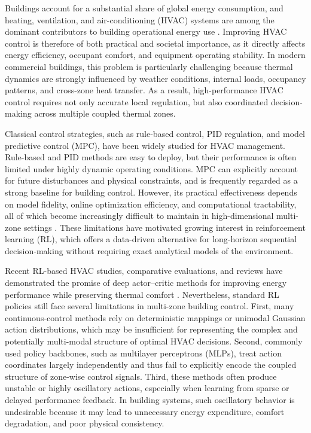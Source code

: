 \documentclass[lettersize,journal]{IEEEtran}
\theoremstyle{nonumberplain}     \theoremheaderfont{\bfseries\itshape}     \theorembodyfont{\normalfont}     \theoremseparator{:}     \theoremsymbol{\ensuremath{\blacksquare}}     \newtheorem{proof}{Proof}
\theoremstyle{plain}     \theoremheaderfont{\bfseries\itshape}     \theorembodyfont{\normalfont}     \theoremseparator{:}     \theoremsymbol{\ensuremath{\blacksquare}}     \newtheorem{remark}{Remark}
\begin{document}
Buildings account for a substantial share of global energy consumption, and heating, ventilation, and air-conditioning (HVAC) systems are among the dominant contributors to building operational energy use \cite{perez2008review,cao2016building,cuce2026role}. Improving HVAC control is therefore of both practical and societal importance, as it directly affects energy efficiency, occupant comfort, and equipment operating stability. In modern commercial buildings, this problem is particularly challenging because thermal dynamics are strongly influenced by weather conditions, internal loads, occupancy patterns, and cross-zone heat transfer. As a result, high-performance HVAC control requires not only accurate local regulation, but also coordinated decision-making across multiple coupled thermal zones.

Classical control strategies, such as rule-based control, PID regulation, and model predictive control (MPC), have been widely studied for HVAC management. Rule-based and PID methods are easy to deploy, but their performance is often limited under highly dynamic operating conditions. MPC can explicitly account for future disturbances and physical constraints, and is frequently regarded as a strong baseline for building control. However, its practical effectiveness depends on model fidelity, online optimization efficiency, and computational tractability, all of which become increasingly difficult to maintain in high-dimensional multi-zone settings \cite{drgovna2020all}. These limitations have motivated growing interest in reinforcement learning (RL), which offers a data-driven alternative for long-horizon sequential decision-making without requiring exact analytical models of the environment.

Recent RL-based HVAC studies, comparative evaluations, and reviews have demonstrated the promise of deep actor--critic methods for improving energy performance while preserving thermal comfort \cite{wei2017deep,biemann2021experimental,mason2019review,alsayed2024hvacreview}. Nevertheless, standard RL policies still face several limitations in multi-zone building control. First, many continuous-control methods rely on deterministic mappings or unimodal Gaussian action distributions, which may be insufficient for representing the complex and potentially multi-modal structure of optimal HVAC decisions. Second, commonly used policy backbones, such as multilayer perceptrons (MLPs), treat action coordinates largely independently and thus fail to explicitly encode the coupled structure of zone-wise control signals. Third, these methods often produce unstable or highly oscillatory actions, especially when learning from sparse or delayed performance feedback. In building systems, such oscillatory behavior is undesirable because it may lead to unnecessary energy expenditure, comfort degradation, and poor physical consistency.
\end{document}
